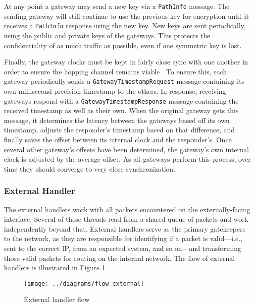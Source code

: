 \par At any point a gateway may send a new key via a \texttt{PathInfo} message. The sending gateway will still continue to use the previous key for encryption until it receives a \texttt{PathInfo} response using the new key. New keys are sent periodically, using the public and private keys of the gateways. This protects the confidentiality of as much traffic as possible, even if one symmetric key is lost.

\par Finally, the gateway clocks must be kept in fairly close sync with one another in order to ensure the hopping channel remains viable \cite{SandiaDynat, HopProactiveDef}. To ensure this, each gateway periodically sends a \texttt{GatewayTimestampRequest} message containing its own millisecond-precision timestamp to the others. In response, receiving gateways respond with a \texttt{GatewayTimestampResponse} message containing the received timestamp as well as their own. When the original gateway gets this message, it determines the latency between the gateways based off its own timestamp, adjusts the responder's timestamp based on that difference, and finally saves the offset between its internal clock and the responder's. Once several other gateway's offsets have been determined, the gateway's own internal clock is adjusted by the average offset. As all gateways perform this process, over time they should converge to very close synchronization.

\subsubsection{External Handler}
\label{sec:external_handler}

\par The external handlers work with all packets encountered on the externally-facing interface. Several of these threads read from a shared queue of packets and work independently beyond that. External handlers serve as the primary gatekeepers to the network, as they are responsible for identifying if a packet is valid---i.e., sent to the correct IP, from an expected system, and so on---and transforming those valid packets for routing on the internal network. The flow of external handlers is illustrated in Figure \ref{fig:flow_external}.

\begin{figure}
	\centering
	\texttt{[image: ../diagrams/flow\_external]}
	\caption{External handler flow}
	\label{fig:flow_external}
\end{figure}

